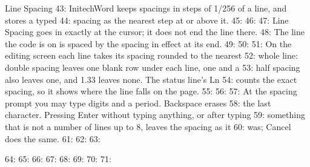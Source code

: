 \begin{Feature}{Line Spacing}
43: InitechWord keeps spacings in steps of 1/256 of a line, and stores a typed
44: spacing as the nearest step at or above it.
45: 
46: 
47: Line Spacing goes in exactly at the cursor; it does not end the line there.
48: The line the code is on is spaced by the spacing in effect at its end.
49: 
50: 
51: On the editing screen each line takes its spacing rounded to the nearest
52: whole line: double spacing leaves one blank row under each line, one and a
53: half spacing also leaves one, and 1.33 leaves none.  The status line's Ln
54: counts the exact spacing, so it shows where the line falls on the page.
55: 
56: 
57: At the spacing prompt you may type digits and a period.  Backspace erases
58: the last character.  Pressing Enter without typing anything, or after typing
59: something that is not a number of lines up to 8, leaves the spacing as it
60: was; Cancel does the same.
61: 
62: 
63: \end{Feature}
64: 
65: %
66: %
67: %
68: %
69: %
70: %
71: %
